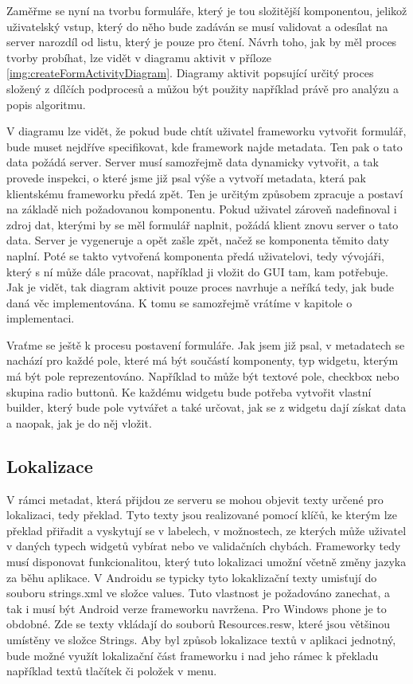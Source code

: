Zaměřme se nyní na tvorbu formuláře, který je tou složitější komponentou, jelikož uživatelský vstup, který do něho bude zadáván se musí validovat a odesílat na server narozdíl od listu, který je pouze pro čtení. Návrh toho, jak by měl proces tvorby probíhat, lze vidět v diagramu aktivit v příloze \ref{img:createFormActivityDiagram}. Diagramy aktivit popsující určitý proces složený z dílčích podprocesů a můžou být použity například právě pro analýzu a popis algoritmu. 

V diagramu lze vidět, že pokud bude chtít uživatel frameworku vytvořit formulář, bude muset nejdříve specifikovat, kde framework najde metadata. Ten pak o tato data požádá server. Server musí samozřejmě data dynamicky vytvořit, a tak provede inspekci, o které jsme již psal výše a vytvoří metadata, která pak klientskému frameworku předá zpět. Ten je určitým způsobem zpracuje a postaví na základě nich požadovanou komponentu. Pokud uživatel zároveň nadefinoval i zdroj dat, kterými by se měl formulář naplnit, požádá klient znovu server o tato data. Server je vygeneruje a opět zašle zpět, načež se komponenta těmito daty naplní. Poté se takto vytvořená komponenta předá uživatelovi, tedy vývojáři, který s ní může dále pracovat, například ji vložit do GUI tam, kam potřebuje. Jak je vidět, tak diagram aktivit pouze proces navrhuje a neříká tedy, jak bude daná věc implementována. K tomu se samozřejmě vrátíme v kapitole o implementaci. 

Vraťme se ještě k procesu postavení formuláře. Jak jsem již psal, v metadatech se nachází pro každé pole, které má být součástí komponenty, typ widgetu, kterým má být pole reprezentováno. Například to může být textové pole, checkbox nebo skupina radio buttonů. Ke každému widgetu bude potřeba vytvořit vlastní builder, který bude pole vytvářet a také určovat, jak se z widgetu dají získat data a naopak, jak je do něj vložit. 

\subsection{Lokalizace}
V rámci metadat, která přijdou ze serveru se mohou objevit texty určené pro lokalizaci, tedy překlad. Tyto texty jsou realizované pomocí klíčů, ke kterým lze překlad přiřadit a vyskytují se v labelech, v možnostech, ze kterých může uživatel v daných typech widgetů vybírat nebo ve validačních chybách. Frameworky tedy musí disponovat funkcionalitou, který tuto lokalizaci umožní včetně změny jazyka za běhu aplikace. V Androidu se typicky tyto lokaklizační texty umisťují do souboru strings.xml ve složce values. Tuto vlastnost je požadováno zanechat, a tak i musí být Android verze frameworku navržena. Pro Windows phone je to obdobné. Zde se texty vkládají do souborů Resources.resw, které jsou většinou umístěny ve složce Strings. Aby byl způsob lokalizace textů v aplikaci jednotný, bude možné využít lokalizační část frameworku i nad jeho rámec k překladu například textů tlačítek či položek v menu.

